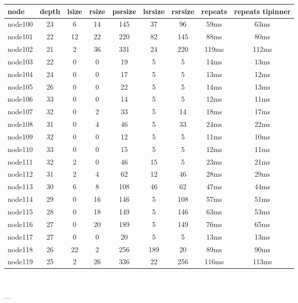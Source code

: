 \begin{tabular}{|l|c|c|c|c|c|c|c|c|}
\hline node & depth & lsize & rsize & psrsize & lsrsize & rsrsize   & repeats & repeats tipinner\\
    \hline node100 & 23 & 6 & 14 & 145 & 37 & 96 & 59ms & 63ms\\
    \hline node101 & 22 & 12 & 22 & 220 & 82 & 145 & 88ms & 80ms\\
    \hline node102 & 21 & 2 & 36 & 331 & 24 & 220 & 119ms & 112ms\\
    \hline node103 & 22 & 0 & 0 & 19 & 5 & 5 & 14ms & 13ms\\
    \hline node104 & 24 & 0 & 0 & 17 & 5 & 5 & 13ms & 12ms\\
    \hline node105 & 26 & 0 & 0 & 22 & 5 & 5 & 14ms & 13ms\\
    \hline node106 & 33 & 0 & 0 & 14 & 5 & 5 & 12ms & 11ms\\
    \hline node107 & 32 & 0 & 2 & 33 & 5 & 14 & 18ms & 17ms\\
    \hline node108 & 31 & 0 & 4 & 46 & 5 & 33 & 24ms & 22ms\\
    \hline node109 & 32 & 0 & 0 & 12 & 5 & 5 & 11ms & 10ms\\
    \hline node110 & 33 & 0 & 0 & 15 & 5 & 5 & 12ms & 11ms\\
    \hline node111 & 32 & 2 & 0 & 46 & 15 & 5 & 23ms & 21ms\\
    \hline node112 & 31 & 2 & 4 & 62 & 12 & 46 & 28ms & 29ms\\
    \hline node113 & 30 & 6 & 8 & 108 & 46 & 62 & 47ms & 44ms\\
    \hline node114 & 29 & 0 & 16 & 146 & 5 & 108 & 57ms & 51ms\\
    \hline node115 & 28 & 0 & 18 & 149 & 5 & 146 & 63ms & 53ms\\
    \hline node116 & 27 & 0 & 20 & 189 & 5 & 149 & 76ms & 65ms\\
    \hline node117 & 27 & 0 & 0 & 20 & 5 & 5 & 13ms & 13ms\\
    \hline node118 & 26 & 22 & 2 & 256 & 189 & 20 & 89ms & 90ms\\
    \hline node119 & 25 & 2 & 26 & 336 & 22 & 256 & 116ms & 113ms\\

\hline
\end{tabular} \

---


